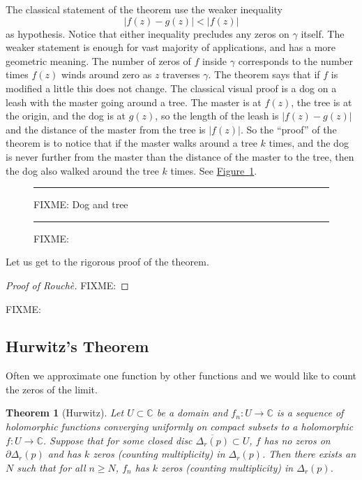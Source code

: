 \documentclass[12pt,openany]{book}
\newcommand{\sabs}[1]{\lvert {#1} \rvert}
\newcommand{\C}{{\mathbb{C}}}
\theoremstyle{plain}
\newtheorem{thm}{Theorem}[section]
\theoremstyle{remark}
\theoremstyle{definition}
\newenvironment{myfig}{%
\begin{figure}[h!t]
\noindent\rule{\textwidth}{0.4pt}\vspace{12pt}\par\centering}%
{\par\noindent\rule{\textwidth}{0.4pt}
\end{figure}}
\theoremstyle{exercise}
\theoremstyle{example}
\newcommand{\figureref}[1]{\hyperref[#1]{Figure~\ref*{#1}}}
\begin{document}
The classical statement of the theorem use the weaker
inequality
\begin{equation*}
\sabs{f(z)-g(z)} < \sabs{f(z)}
\end{equation*}
as hypothesis.
Notice that either inequality precludes any zeros on $\gamma$ itself.
The weaker statement is enough for vast majority of
applications, and has a more geometric meaning.  The number of zeros of $f$
inside $\gamma$ corresponds to the number times $f(z)$ winds around zero
as $z$ traverses $\gamma$.  The theorem says that if $f$ is modified a
little this does not change.  The classical visual proof is a dog on a leash
with the master going around a tree.  The master is at $f(z)$, the tree is
at the origin, and the dog is at $g(z)$, so the length of the leash is
$\sabs{f(z)-g(z)}$ and the distance of the master from the tree is
$\sabs{f(z)}$.  So the ``proof'' of the theorem is to notice that if the
master walks around a tree $k$ times, and the dog is never further from the
master than the distance of the master to the tree, then the dog also walked
around the tree $k$ times.  See \figureref{fig:dogtree}.

\begin{myfig}
FIXME: Dog and tree
\caption{FIXME:\label{fig:dogtree}}
\end{myfig}

Let us get to the rigorous proof of the theorem.

\begin{proof}[Proof of Rouch\`e]
FIXME:
\end{proof}

FIXME:

\subsection{Hurwitz's Theorem}

Often we approximate one function by other functions and we would like to
count the zeros of the limit.

\begin{thm}[Hurwitz]
Let $U \subset \C$ be a domain and $f_n \colon U \to \C$ is a sequence of
holomorphic functions converging uniformly on compact subsets
to a holomorphic $f \colon U \to \C$.  Suppose that for some closed
disc $\overline{\Delta_r(p)} \subset U$, $f$ has no zeros on $\partial
\Delta_r(p)$ and has $k$ zeros (counting multiplicity) in $\Delta_r(p)$.
Then there exists an $N$ such that for all $n \geq N$,
$f_n$ has $k$ zeros (counting multiplicity) in $\Delta_r(p)$.
\end{thm}
\end{document}
